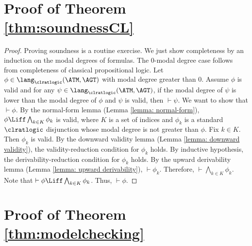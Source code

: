  \section{Proof of Theorem \ref{thm:soundnessCL}}\label{section: complete proof}
  \begin{proof}
Proving soundness is a
routine exercise. 
 We just show  completeness
 by an induction on the modal
 degrees of formulas. 
 The $0$-modal degree case
 follows from
 completeness of classical propositional logic. 
Let 
   $\phi \in \lang_{\clratlogic}(\ATM, \AGT )$ with modal degree  greater than $0$. Assume $ \phi $ 
   is valid
   and for any 
    $\psi \in \lang_{\clratlogic}(\ATM, \AGT )$, if
    the modal degree of $\psi $ is lower
    than
    the modal degree of
    $\phi $ and $ \psi $ is valid, then $\vdash \psi $. We want to show that 
    $\vdash \phi $.
  By the normal-form lemma (Lemma \ref{lemma: normal-form}), $\phi \Liff \bigwedge_{k\in K}\phi_k$
  is valid, where $K$ is a set of indices and $\phi_k $ is a standard
  $ \clratlogic$ disjunction whose modal degree is not greater than $\phi $. Fix $k\in K$. Then $ \phi_k$
  is valid. By the downward validity lemma (Lemma \ref{lemma: downward validity}),  the validity-reduction condition for 
  $\phi_k $ holds. By inductive hypothesis, the 
  derivability-reduction condition
  for $\phi_k $ holds. By 
  the upward derivability lemma (Lemma \ref{lemma: upward derivability}), $\vdash \phi_k$. Therefore, $\vdash \bigwedge_{k\in K}\phi_k$. Note that $\vdash \phi \Liff \bigwedge_{k\in K}\phi_k$. Thus,  $\vdash \phi $.
\end{proof}
  
  \section{Proof of Theorem \ref{thm:modelchecking}}\label{section: proof for modelchecking}

